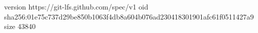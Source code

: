 version https://git-lfs.github.com/spec/v1
oid sha256:01e75c737d29be850b1063f4db8a604b076ad230418301901afc61f0511427a9
size 43840
